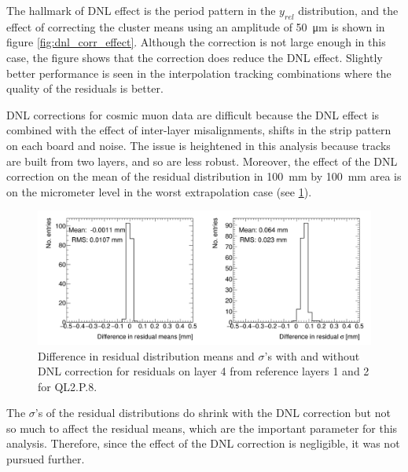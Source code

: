 The hallmark of DNL effect is the period pattern in the $y_{rel}$ distribution, and the effect of correcting the cluster means using an amplitude of \SI{50}{\micro\meter} is shown in figure \ref{fig:dnl_corr_effect}. Although the correction is not large enough in this case, the figure shows that the correction does reduce the DNL effect. Slightly better performance is seen in the interpolation tracking combinations where the quality of the residuals is better.  

DNL corrections for cosmic muon data are difficult because the DNL effect is combined with the effect of inter-layer misalignments, shifts in the strip pattern on each board and noise. The issue is heightened in this analysis because tracks are built from two layers, and so are less robust. Moreover, the effect of the DNL correction on the mean of the residual distribution in \SI{100}{\milli\meter} by \SI{100}{\milli\meter} area is on the micrometer level in the worst extrapolation case (see \ref{fig:dnl_compare_fits}).

\begin{figure}
    \centering
    \includegraphics[width = \textwidth]{figures/figure_compare_residual_fits_QL2P08_3100V_2021-06-18_no_dnl_minus_QL2P08_3100V_2021-06-18_2_50um_universal_DNL_layer4_fixedlayers12.png}
    \caption{Difference in residual distribution means and $\sigma$'s with and without DNL correction for residuals on layer 4 from reference layers 1 and 2 for QL2.P.8.}
    \label{fig:dnl_compare_fits}
\end{figure}

The $\sigma$'s of the residual distributions do shrink with the DNL correction but not so much to affect the residual means, which are the important parameter for this analysis. Therefore, since the effect of the DNL correction is negligible, it was not pursued further.
































